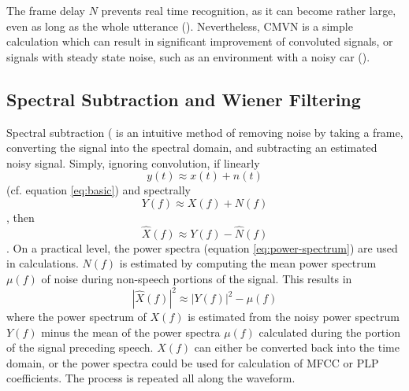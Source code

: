 The frame delay $N$ prevents real time recognition, as it can become rather large, even as long as the whole utterance (\cite{li:14}).  Nevertheless, CMVN is a simple calculation which can result in significant improvement of convoluted signals, or signals with steady state noise, such as an environment with a noisy car (\cite{viikki:98}).

\DIFdelbegin \subsubsection{}%
\addtocounter{subsubsection}{-1}%
\DIFdelend \DIFaddbegin \subsection{Spectral Subtraction and Wiener Filtering}\DIFaddend \label{sec:spec-sub_wiener}

Spectral subtraction (\cite{boll:79} is an intuitive method of removing noise by taking a frame, converting the signal into the spectral domain, and subtracting an estimated noisy signal. Simply, ignoring convolution, if linearly \begin{equation} y(t) \approx x(t) + n(t) \end{equation} (cf. equation \ref{eq:basic}) and spectrally \begin{equation} Y(f) \approx X(f) + N(f) \end{equation}, then \begin{equation} \hat{X}(f) \approx Y(f) - \hat{N}(f) \end{equation}.  On a practical level, the power spectra (equation \ref{eq:power-spectrum}) are used in calculations.  $N(f)$ is estimated by computing the mean power spectrum $\mu(f)$ of noise during non-speech portions of the signal.  This results in \begin{equation} |\hat{X}(f)|^2 \approx |Y(f)|^2 - \mu(f) \end{equation} where the power spectrum of $X(f)$ is estimated from the noisy power spectrum $Y(f)$ minus the mean of the power spectra $\mu(f)$ calculated during the portion of the signal preceding speech. $X(f)$ can either be converted back into the time domain, or the power spectra could be used for calculation of MFCC or PLP coefficients.  The process is repeated all along the waveform.

